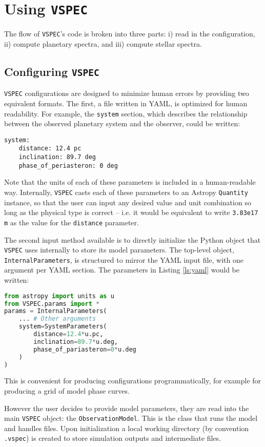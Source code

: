 \documentclass[twocolumn]{aastex631}
\newcommand{\vspec}[1]{\texttt{VSPEC}#1}
\begin{document}
\section{Using \vspec{}}
\label{sec:vspec}

The flow of \vspec{}'s code is broken into three parts: i) read in the configuration, ii) compute planetary spectra, and iii) compute stellar spectra.
\subsection{Configuring \vspec{}}
\label{subsec:config}

\vspec{} configurations are designed to minimize human errors by providing two equivalent formats. The first, a file written in YAML, is optimized for
human readability. For example, the \texttt{system} section, which describes the relationship between the observed planetary system and the observer, could
be written:
\begin{lstlisting}[label={ls:yaml}]
system:
    distance: 12.4 pc
    inclination: 89.7 deg
    phase_of_periasteron: 0 deg
\end{lstlisting}
Note that the units of each of these parameters is included in a human-readable way. Internally, \vspec{} casts each of these parameters to an Astropy
\texttt{Quantity} instance, so that the user can input any desired value and unit combination so long as the physical type is correct -- i.e. it would be
equivalent to write \texttt{3.83e17 m} as the value for the \texttt{distance} parameter.

The second input method available is to directly initialize the Python object that \vspec{} uses internally to store its model parameters.
The top-level object, \texttt{InternalParameters}, is structured to mirror the YAML input file, with one argument per YAML section. The
parameters in Listing \ref{ls:yaml} would be written:
\begin{lstlisting}[language=Python]
from astropy import units as u
from VSPEC.params import *
params = InternalParameters(
    ... # Other arguments
    system=SystemParameters(
        distance=12.4*u.pc,
        inclination=89.7*u.deg,
        phase_of_pariasteron=0*u.deg
    )
)
\end{lstlisting}
This is convenient for producing configurations programmatically, for example for producing a grid of model phase curves.

However the user decides to provide model parameters, they are read into the main \vspec{} object: the \texttt{ObservationModel}.
This is the class that runs the model and handles files. Upon initialization a local working directory
(by convention \texttt{.vspec}) is created to store simulation outputs and intermediate files.
\end{document}
